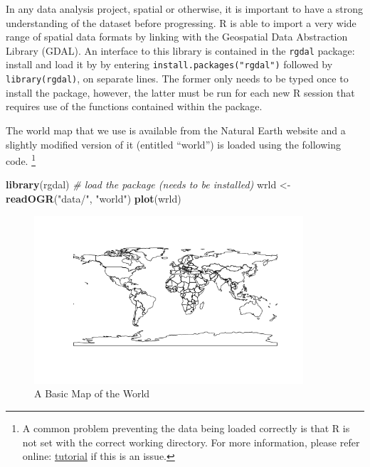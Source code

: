\documentclass[]{article}
\newenvironment{Shaded}{}{}
\newcommand{\KeywordTok}[1]{\textcolor[rgb]{0.00,0.44,0.13}{\textbf{{#1}}}}
\newcommand{\StringTok}[1]{\textcolor[rgb]{0.25,0.44,0.63}{{#1}}}
\newcommand{\CommentTok}[1]{\textcolor[rgb]{0.38,0.63,0.69}{\textit{{#1}}}}
\newcommand{\NormalTok}[1]{{#1}}
\let\Oldincludegraphics\includegraphics
\renewcommand{\includegraphics}[1]{\Oldincludegraphics[width=10cm]{#1}}
\begin{document}
In any data analysis project, spatial or otherwise, it is important to
have a strong understanding of the dataset before progressing. R is able to import a very wide range of spatial data formats by linking with the Geospatial Data Abstraction Library (GDAL). An interface to this library
is contained in the \texttt{rgdal} package: install and load it by by
entering \texttt{install.packages("rgdal")} followed by
\texttt{library(rgdal)}, on separate lines. The former only needs to be
typed once to install the package, however, the latter must be
run for each new R session that requires use of the functions contained within the package.

The world map that we use is available from the Natural Earth website and a
slightly modified version of it (entitled ``world'') is loaded using the
following code. \footnote{ A common problem preventing the data being loaded
correctly is that R is not set with the correct working directory.
For more information, please refer online:
\href{https://github.com/geocomPP/sdvwR/blob/master/sdv-tutorial.pdf?raw=true}{tutorial}
if this is an issue.}

\begin{Shaded}
\begin{Highlighting}[]
\KeywordTok{library}\NormalTok{(rgdal)  }\CommentTok{# load the package (needs to be installed)}
\NormalTok{wrld <- }\KeywordTok{readOGR}\NormalTok{(}\StringTok{"data/"}\NormalTok{, }\StringTok{"world"}\NormalTok{)}
\KeywordTok{plot}\NormalTok{(wrld)}
\end{Highlighting}
\end{Shaded}
\begin{figure}[htbp]
\centering
\includegraphics{figure/A_Basic_Map_of_the_World.png}
\caption{A Basic Map of the World}
\end{figure}
\end{document}
